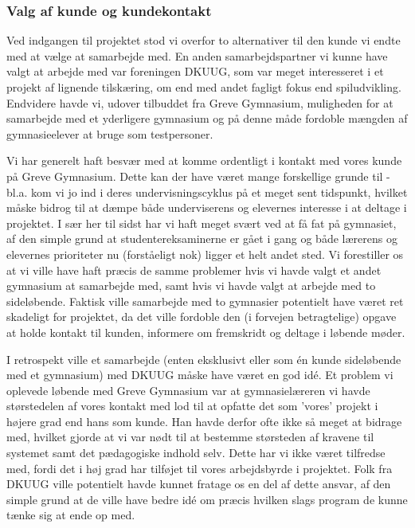 \documentclass[10pt,a4paper,danish]{article}
\begin{document}
\subsubsection{Valg af kunde og kundekontakt}
Ved indgangen til projektet stod vi overfor to alternativer til den kunde vi endte med
at vælge at samarbejde med. En anden samarbejdspartner vi kunne have valgt at arbejde med
var foreningen DKUUG, som var meget interesseret i et projekt af lignende tilskæring, om end
med andet fagligt fokus end spiludvikling. Endvidere havde vi, udover tilbuddet fra Greve
Gymnasium, muligheden for at samarbejde med et yderligere gymnasium og på denne måde fordoble
mængden af gymnasieelever at bruge som testpersoner. 

Vi har generelt haft besvær med at komme ordentligt i kontakt med vores kunde på Greve Gymnasium. 
Dette kan der have været mange forskellige grunde til - bl.a. kom vi jo ind i deres undervisningscyklus
på et meget sent tidspunkt, hvilket måske bidrog til at dæmpe både underviserens og elevernes 
interesse i at deltage i projektet. I sær her til sidst har vi haft meget svært ved at få fat
på gymnasiet, af den simple grund at studentereksaminerne er gået i gang og både lærerens og
elevernes prioriteter nu (forståeligt nok) ligger et helt andet sted. Vi forestiller os at vi ville
have haft præcis de samme problemer hvis vi havde valgt et andet gymnasium at samarbejde med, samt 
hvis vi havde valgt at arbejde med to sideløbende. Faktisk ville samarbejde med to gymnasier potentielt
have været ret skadeligt for projektet, da det ville fordoble den (i forvejen betragtelige) opgave 
at holde kontakt til kunden, informere om fremskridt og deltage i løbende møder. 

I retrospekt ville et samarbejde (enten eksklusivt eller som én kunde sideløbende med et gymnasium) med 
DKUUG måske have været en god idé. Et problem vi oplevede løbende med Greve Gymnasium var at gymnasielæreren
vi havde størstedelen af vores kontakt med lod til at opfatte det som 'vores' projekt i højere grad end 
hans som kunde. Han havde derfor ofte ikke så meget at bidrage med, hvilket gjorde at vi var nødt til at
bestemme størsteden af kravene til systemet samt det pædagogiske indhold selv. Dette har vi ikke været tilfredse
med, fordi det i høj grad har tilføjet til vores arbejdsbyrde i projektet. Folk fra DKUUG ville potentielt
havde kunnet fratage os en del af dette ansvar, af den simple grund at de ville have bedre idé om præcis
hvilken slags program de kunne tænke sig at ende op med. 
\end{document}
